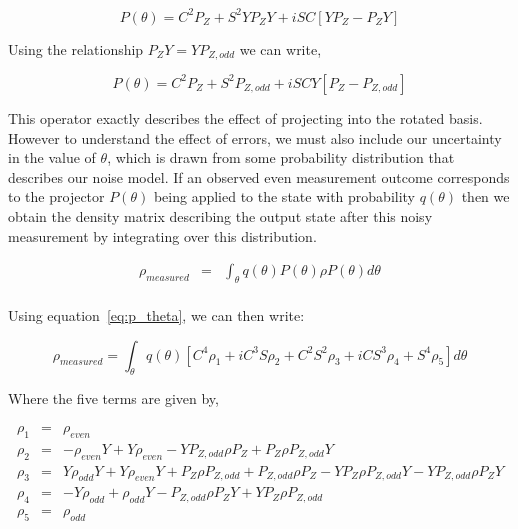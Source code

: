 \documentclass[prl, twocolumn, ,superscriptaddress]{revtex4-1}
\begin{document}
\[
P\left(\theta\right)  =  C^{2}P_{Z}+S^{2}YP_{Z}Y+iSC\left[YP_{Z}-P_{Z}Y\right]
\]


Using the relationship $P_{Z}Y=YP_{Z,odd}$ we can write,

\begin{equation}
\label{eq:p_theta}
P\left(\theta\right)  =  C^{2}P_{Z}+S^{2}P_{Z,odd}+iSCY\left[P_{Z}-P_{Z,odd}\right]
\end{equation}


This operator exactly describes the effect of projecting into the rotated basis. However to understand the effect of 
errors, we must also include our uncertainty in the value of $\theta$, which is drawn from some probability distribution that
describes our noise model. If an observed even measurement outcome corresponds to the projector $P\left(\theta\right)$ being 
applied to the state with probability $q\left(\theta\right)$ then we obtain the density matrix describing the output state after 
this noisy measurement by integrating over this distribution.

\begin{eqnarray*}
\rho_{measured} & = & \int_{\theta} q\left(\theta\right)P\left(\theta\right)\rho P\left(\theta\right)d\theta\\
\end{eqnarray*}

Using equation~\ref{eq:p_theta}, we can then write:

\[
\rho_{measured}  = \int_{\theta} q(\theta) \left[ C^{4} \rho_1 + iC^{3}S \rho_2 +C^{2}S^{2} \rho_3 +iCS^{3} \rho_4 + S^{4} \rho_5 \right] d\theta
\]
 
Where the five terms are given by,
 
 \begin{eqnarray*}
 \rho_1 & = & \rho_{even}\\
 \rho_2 & = & -\rho_{even}Y+Y\rho_{even}-YP_{Z,odd}\rho P_{Z}+P_{Z}\rho P_{Z,odd}Y\\
 \rho_3 & = & Y\rho_{odd}Y+Y\rho_{even}Y+P_{Z}\rho P_{Z,odd}+P_{Z,odd}\rho P_{Z}-YP_{Z}\rho P_{Z,odd}Y-YP_{Z,odd}\rho P_{Z}Y\\
 \rho_4 & = & -Y\rho_{odd}+\rho_{odd}Y-P_{Z,odd}\rho P_{Z}Y+YP_{Z}\rho P_{Z,odd}\\
 \rho_5 & = & \rho_{odd}
 \end{eqnarray*}
\end{document}
